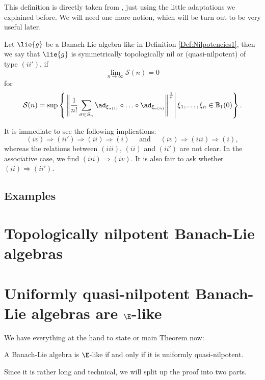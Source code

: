 \documentclass[
11pt,                          %
english                        %
]{article}
\begin{document}
This definition is directly taken from \cite{muller}, just using the little adaptations we explained before. We will need one more notion, which will be 
turn out to be very useful later.
\begin{definition}
	\label{Def:Nilpotencies2}
	Let $\lie{g}$ be a Banach-Lie algebra like in Definition 
	\ref{Def:Nilpotencies1}, then we say that $\lie{g}$ is symmetrically
	topologically nil or (quasi-nilpotent) of type $(ii')$, if
	\begin{equation*}
		\lim_{n \longrightarrow \infty}
		\mathcal{S}(n)
		=
		0
	\end{equation*}
	for
	\begin{equation}
		\mathcal{S}(n)
		=
		\sup \left\{ 
		\left.
			\left\Vert
				\frac{1}{n!}
				\sum\limits_{\sigma \in S_n}
				\ad_{\xi_{\sigma(1)}} \circ \ldots \circ \ad_{\xi_{\sigma(n)}}
			\right\Vert^{\frac{1}{n}} 
		\right|
			\xi_1, \ldots, \xi_n \in \mathbb{B}_1(0)
		\right\}.
	\end{equation}
\end{definition}
It is immediate to see the following implications:
\begin{equation*}
	(iv) \Longrightarrow 
	(ii') \Longrightarrow 
	(ii) \Longrightarrow 
	(i)
	\quad \text{ and } \quad
	(iv) \Longrightarrow
	(iii) \Longrightarrow 
	(i),
\end{equation*}
whereas the relations between $(iii)$, $(ii)$ and $(ii')$ are not clear. In the 
associative case, we find $(iii) \Longrightarrow (iv)$. It is also fair to ask 
whether $(ii) \Longrightarrow (ii')$.

\subsection{Examples}


\section{Topologically nilpotent Banach-Lie algebras}


\section{Uniformly quasi-nilpotent Banach-Lie algebras are $\E$-like}

We have everything at the hand to state or main Theorem now:
\begin{theorem}
	\label{Thm:Main}
	A Banach-Lie algebra is $\E$-like if and only if it is uniformly 
	quasi-nilpotent.
\end{theorem}
Since it is rather long and technical, we will split up the proof into two parts.
\end{document}
